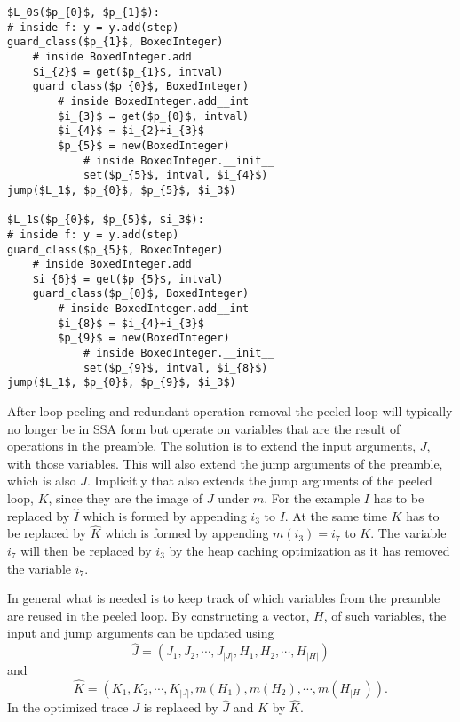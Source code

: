 \documentclass[preprint]{sigplanconf}
\begin{document}
\begin{lstlisting}[mathescape,numbers = right,basicstyle=\setstretch{1.05}\ttfamily\scriptsize]
$L_0$($p_{0}$, $p_{1}$):
# inside f: y = y.add(step)
guard_class($p_{1}$, BoxedInteger)
    # inside BoxedInteger.add
    $i_{2}$ = get($p_{1}$, intval)
    guard_class($p_{0}$, BoxedInteger)
        # inside BoxedInteger.add__int
        $i_{3}$ = get($p_{0}$, intval)
        $i_{4}$ = $i_{2}+i_{3}$
        $p_{5}$ = new(BoxedInteger)
            # inside BoxedInteger.__init__
            set($p_{5}$, intval, $i_{4}$)
jump($L_1$, $p_{0}$, $p_{5}$, $i_3$)

$L_1$($p_{0}$, $p_{5}$, $i_3$):
# inside f: y = y.add(step)
guard_class($p_{5}$, BoxedInteger)
    # inside BoxedInteger.add
    $i_{6}$ = get($p_{5}$, intval)
    guard_class($p_{0}$, BoxedInteger)
        # inside BoxedInteger.add__int
        $i_{8}$ = $i_{4}+i_{3}$
        $p_{9}$ = new(BoxedInteger)
            # inside BoxedInteger.__init__
            set($p_{9}$, intval, $i_{8}$)
jump($L_1$, $p_{0}$, $p_{9}$, $i_3$)
\end{lstlisting}

After loop peeling and redundant operation removal the peeled loop
will typically no longer be in SSA form but operate on variables that are the result
of operations in the preamble. The solution is to extend the input
arguments, $J$, with those variables. This will also extend the
jump arguments of the preamble, which is also $J$. 
Implicitly that also extends the jump arguments of the peeled loop, $K$,
since they are the image of $J$ under $m$. For the example $I$ has to
be replaced by $\hat I$ which is formed by appending $i_3$ to $I$.
At the same time $K$ has to be replaced by
$\hat K$ which is formed by appending $m\left(i_3\right)=i_7$ to $K$.
The variable $i_7$ will then be replaced by $i_3$ by the heap caching
optimization as it has removed the variable $i_7$.

In general what is needed is to keep track of
which variables from the preamble are reused in the peeled loop.
By constructing a vector, $H$,  of such variables, the input and jump
arguments can be updated using
\begin{equation}
  \hat J = \left(J_1, J_2, \cdots, J_{|J|}, H_1, H_2, \cdots, H_{|H|}\right)
  \label{eq:heap-inputargs}
\end{equation}
and
\begin{equation}
  \hat K = \left(K_1, K_2, \cdots, K_{|J|}, m(H_1), m(H_2), \cdots, m(H_{|H|})\right)
  .
  \label{eq:heap-jumpargs}
\end{equation}
In the optimized trace $J$ is replaced by $\hat J$ and $K$ by $\hat
K$.
\end{document}
